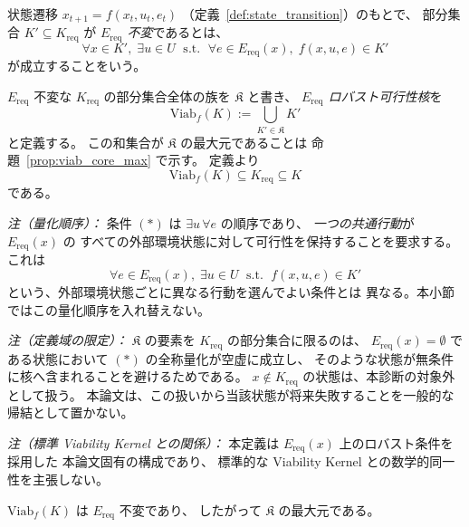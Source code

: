\begin{definition}
\label{def:viab_core}
状態遷移 $x_{t+1}=f(x_t,u_t,e_t)$
（定義~\ref{def:state_transition}）のもとで、
部分集合 $K'\subseteq K_{\mathrm{req}}$ が
\emph{$E_{\mathrm{req}}$ 不変}であるとは、
\[
  \forall x\in K',\;
  \exists u\in U
  \;\text{ s.t. }\;
  \forall e\in E_{\mathrm{req}}(x),\;
  f(x,u,e)\in K'
  \tag{$\ast$}
\]
が成立することをいう。

$E_{\mathrm{req}}$ 不変な $K_{\mathrm{req}}$ の部分集合全体の族を
$\mathfrak{K}$ と書き、
\emph{$E_{\mathrm{req}}$ ロバスト可行性核}を
\[
  \mathrm{Viab}_f(K)
  :=
  \bigcup_{K'\in\mathfrak{K}} K'
\]
と定義する。
この和集合が $\mathfrak{K}$ の最大元であることは
命題~\ref{prop:viab_core_max} で示す。
定義より
\[
  \mathrm{Viab}_f(K)
  \subseteq
  K_{\mathrm{req}}
  \subseteq
  K
\]
である。

\textit{注（量化順序）：}
条件 $(\ast)$ は $\exists u\,\forall e$ の順序であり、
\emph{一つの共通行動}が $E_{\mathrm{req}}(x)$ の
すべての外部環境状態に対して可行性を保持することを要求する。
これは
\[
  \forall e\in E_{\mathrm{req}}(x),\;
  \exists u\in U
  \;\text{ s.t. }\;
  f(x,u,e)\in K'
\]
という、外部環境状態ごとに異なる行動を選んでよい条件とは
異なる。本小節ではこの量化順序を入れ替えない。

\textit{注（定義域の限定）：}
$\mathfrak{K}$ の要素を $K_{\mathrm{req}}$ の部分集合に限るのは、
$E_{\mathrm{req}}(x)=\emptyset$ である状態において
$(\ast)$ の全称量化が空虚に成立し、
そのような状態が無条件に核へ含まれることを避けるためである。
$x\notin K_{\mathrm{req}}$ の状態は、本診断の対象外として扱う。
本論文は、この扱いから当該状態が将来失敗することを一般的な帰結として置かない。

\textit{注（標準 Viability Kernel との関係）：}
本定義は $E_{\mathrm{req}}(x)$ 上のロバスト条件を採用した
本論文固有の構成であり、
標準的な Viability Kernel との数学的同一性を主張しない。
\end{definition}

\begin{proposition}
\label{prop:viab_core_max}
$\mathrm{Viab}_f(K)$ は $E_{\mathrm{req}}$ 不変であり、
したがって $\mathfrak{K}$ の最大元である。
\end{proposition}


